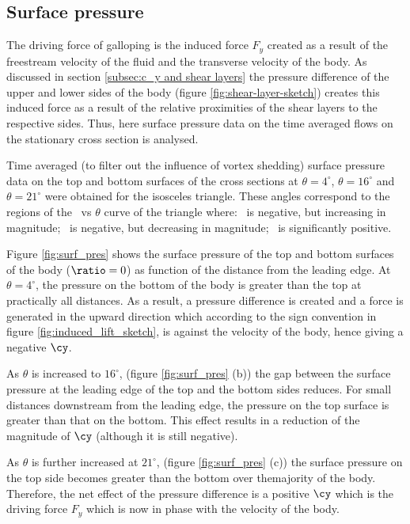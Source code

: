 \subsection{Surface pressure}
\label{subsec:cross-sec-surface pressure}

The driving force of galloping is the induced force $F_y$ created as a result of the freestream velocity of the fluid and the transverse velocity of the body. As discussed in section \ref{subsec:c_y and shear layers} the pressure difference of the upper and lower sides of the body (figure \ref{fig:shear-layer-sketch}) creates this induced force as a result of the relative proximities of the shear layers to the respective sides. Thus, here surface pressure data on the time averaged flows on the stationary cross section is analysed.

Time averaged (to filter out the influence of vortex shedding) surface pressure data  on the top and bottom surfaces of the cross sections at $\theta=4^{\circ}$, $\theta=16^{\circ}$ and $\theta=21^{\circ}$ were obtained for the isosceles triangle. These angles correspond to the regions of the \cy\ vs $\theta$ curve of the triangle where: \cy\ is negative, but increasing in magnitude; \cy\ is negative, but decreasing in magnitude; \cy\ is significantly positive.   
 
 

 Figure \ref{fig:surf_pres} shows the surface pressure of the top and bottom surfaces of the body ($\ratio=0$) as function of the distance from the leading edge. At $\theta=4^{\circ}$, the pressure on the bottom of the body is greater than the top at practically all distances. As a result, a pressure difference is created and a force is generated in the upward direction which according to the sign convention in figure \ref{fig:induced_lift_sketch}, is against the velocity of the body, hence giving a negative $\cy$.

As $\theta$ is increased to $16^{\circ}$, (figure \ref{fig:surf_pres} (b)) the gap between the surface pressure at the leading edge of the top and the bottom sides reduces. For small distances downstream from the leading edge, the pressure on the top surface is greater than that on the bottom. This effect results in a reduction of the magnitude of $\cy$ (although it is still negative).

As $\theta$ is further increased at $21^{\circ}$, (figure \ref{fig:surf_pres} (c)) the surface pressure on the top side becomes greater than the bottom over themajority of the body. Therefore, the net effect of the pressure difference is a positive $\cy$ which is the driving force $F_y$ which is now in phase with the velocity of the body.


